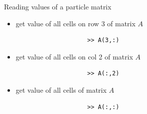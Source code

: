 \documentclass{beamer}
\begin{document}
\begin{frame}[fragile]{Reading values of a particle matrix}
	\begin{block}{}
		\begin{itemize}
			\item get value of all cells on row 3 of matrix $A$
			\java
				\begin{lstlisting}
					>> A(3,:)
				\end{lstlisting}
			\item get value of all cells on col 2 of matrix $A$
			\java
				\begin{lstlisting}
					>> A(:,2)
				\end{lstlisting}
			\item get value of all cells of matrix $A$
			\java
				\begin{lstlisting}
					>> A(:,:)
				\end{lstlisting}
		\end{itemize}
	\end{block}
\end{frame}


%



%
%
%	
%
%
\end{document}
